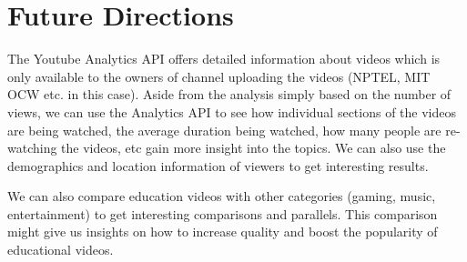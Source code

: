 \documentclass{article}
\begin{document}
\section{Future Directions}
The Youtube Analytics API offers detailed information about videos which is only available to the owners of channel uploading the videos (NPTEL, MIT OCW etc. in this case). Aside from the analysis simply based on the number of views, we can use the Analytics API to see how individual sections of the videos are being watched, the average duration being watched, how many people are re-watching the videos, etc gain more insight into the topics. We can also use the demographics and location information of viewers to get interesting results.

We can also compare education videos with other categories (gaming, music, entertainment) to get interesting comparisons and parallels. This comparison might give us insights on how to increase quality and boost the popularity of educational videos.
\nocite{*}


\end{document}
